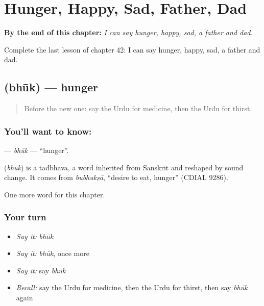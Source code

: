 
\chapter{Hunger, Happy, Sad, Father, Dad}
\label{ch:ur-hunger-happy-sad-father-dad}

\begin{chapteropening}
\textbf{By the end of this chapter:} \emph{I can say hunger, happy, sad, a father and dad.}

Complete the last lesson of chapter 42: I can say hunger, happy, sad, a father and dad.
\end{chapteropening}

\section[\texorpdfstring{\ur{بھوک} (bhūk)}{بھوک (bhūk)}]{ (bhūk) — hunger}

\label{lesson:UR-C42-bhuk}



\begin{quote}
Before the new one: say the Urdu for medicine, then the Urdu for thirst.
\end{quote}

\subsection*{You'll want to know: }
\textbf{} — \emph{bhūk} — \textquotedblleft{}hunger\textquotedblright{}.

\begin{cousinweb}
\textbf{} (\emph{bhūk}) is a tadbhava, a word inherited from Sanskrit and reshaped by sound change. It comes from \emph{bubhukṣā}, \textquotedblleft{}desire to eat, hunger\textquotedblright{} (CDIAL 9286).
\end{cousinweb}

\begin{grammarlens}[title={What you've built}]
One more word for this chapter.
\end{grammarlens}

\subsection*{Your turn}
\begin{itemize}
\raggedright
  \item \emph{Say it:} \emph{bhūk}
  \item \emph{Say it:} \emph{bhūk}, once more
  \item \emph{Say it:} say \emph{bhūk}
  \item \emph{Recall:} say the Urdu for medicine, then the Urdu for thirst, then say \emph{bhūk} again
\end{itemize}


